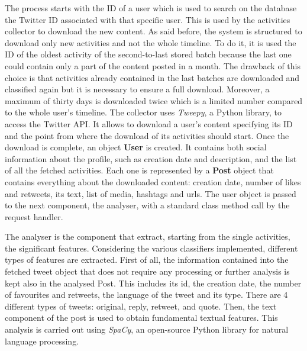 The process starts with the ID of a user which is used to search on the database the Twitter ID associated with that specific user. 
This is used by the activities collector to download the new content. As said before, the system is structured to download only new activities and not the whole timeline.
To do it, it is used the ID of the oldest activity of the second-to-last stored batch because the last one could contain only a part of the content posted in a month. 
The drawback of this choice is that activities already contained in the last batches are downloaded and classified again but it is necessary to ensure a full download. Moreover, a maximum of thirty days is downloaded twice which is a limited number compared to the whole user's timeline.
The collector uses \textit{Tweepy}, a Python library, to access the Twitter API. It allows to download a user's content specifying its ID and the point from where the download of its activities should start.
Once the download is complete, an object \textbf{User} is created. It contains both social information about the profile, such as creation date and description, and the list of all the fetched activities. Each one is represented by a \textbf{Post} object that contains everything about the downloaded content: creation date, number of likes and retweets, its text, list of media, hashtags and urls.
The user object is passed to the next component, the analyser, with a standard class method call by the request handler.

The analyser is the component that extract, starting from the single activities, the significant features.
Considering the various classifiers implemented, different types of features are extracted.
First of all, the information contained into the fetched tweet object that does not require any processing or further analysis is kept also in the analysed Post. This includes its id, the creation date, the number of favourites and retweets, the language of the tweet and its type.
There are 4 different types of tweets: original, reply, retweet, and quote.
Then, the text component of the post is used to obtain fundamental textual features. This analysis is carried out using \textit{SpaCy}, an open-source Python library for natural language processing. 
